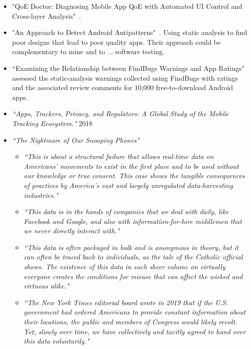 \begin{itemize}
    \item "QoE Doctor: Diagnosing Mobile App QoE with Automated UI Control and Cross-layer Analysis"~\cite{chen2014qoe}.
    \item "An Approach to Detect Android Antipatterns"~\cite{hecht2015approach}. Using static analysis to find poor designs that lead to poor quality apps. Their approach could be complementary to mine and to ... software testing.
    \item ``Examining the Relationship between FindBugs Warnings and App Ratings"~\cite{khalid2016_examining_the_relationship_between_findbugs_warnings_and_app_ratings} assessed the static-analysis warnings collected using FindBugs with ratings and the associated review comments for 10,000 free-to-download Android apps.
    
    \item \emph{``Apps, Trackers, Privacy, and Regulators: A Global Study of the Mobile Tracking Ecosystem."} 2018
    
    \item \emph{``The Nightmare of Our Snooping Phones"}~\citep{nytimes20210721_the_nightmare_of_our_snooping_phones}
    \begin{itemize}
        \item \emph{``This is about a structural failure that allows real-time data on Americans’ movements to exist in the first place and to be used without our knowledge or true consent. This case shows the tangible consequences of practices by America’s vast and largely unregulated data-harvesting industries."}
        \item \emph{``This data is in the hands of companies that we deal with daily, like Facebook and Google, and also with information-for-hire middlemen that we never directly interact with."}
        \item \emph{``This data is often packaged in bulk and is anonymous in theory, but it can often be traced back to individuals, as the tale of the Catholic official shows. The existence of this data in such sheer volume on virtually everyone creates the conditions for misuse that can affect the wicked and virtuous alike."}
        \item \emph{``The New York Times editorial board wrote in 2019 that if the U.S. government had ordered Americans to provide constant information about their locations, the public and members of Congress would likely revolt. Yet, slowly over time, we have collectively and tacitly agreed to hand over this data voluntarily."}
    \end{itemize}
    

\end{itemize}
